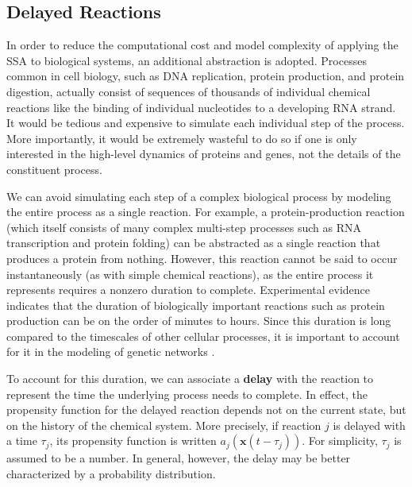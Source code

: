 \documentclass[english,letterpaper,12pt]{report}
\newcommand{\defkeywd}[1]{\textbf{#1}}
\renewcommand{\vec}[1]{\ensuremath{\mathbf{#1}}}
\newcommand{\delaytime}{\ensuremath{\tau}}
\begin{document}
\begin{doublespacing}

\subsection{Delayed Reactions} %
\label{sub:delayed-reactions}

In order to reduce the computational cost and model complexity of applying the SSA to biological systems, an additional abstraction is adopted. Processes common in cell biology, such as DNA replication, protein production, and protein digestion, actually consist of sequences of thousands of individual chemical reactions like the binding of individual nucleotides to a developing RNA strand. It would be tedious and expensive to simulate each individual step of the process. More importantly, it would be extremely wasteful to do so if one is only interested in the high-level dynamics of proteins and genes, not the details of the constituent process.

We can avoid simulating each step of a complex biological process by modeling the entire process as a single reaction. For example, a protein-production reaction (which itself consists of many complex multi-step processes such as RNA transcription and protein folding) can be abstracted as a single reaction that produces a protein from nothing. However, this reaction cannot be said to occur instantaneously (as with simple chemical reactions), as the entire process it represents requires a nonzero duration to complete. Experimental evidence indicates that the duration of biologically important reactions such as protein production can be on the order of minutes to hours. Since this duration is long compared to the timescales of other cellular processes, it is important to account for it in the modeling of genetic networks \cite{delay-oscillations}.

To account for this duration, we can associate a \defkeywd{delay} with the reaction to represent the time the underlying process needs to complete. In effect, the propensity function for the delayed reaction depends not on the current state, but on the history of the chemical system. More precisely, if reaction $j$ is delayed with a time $\delaytime_j$, its propensity function is written $a_j \left(\vec{x}(t - \delaytime_j) \right)$. For simplicity, $\delaytime_j$ is assumed to be a number. In general, however, the delay may be better characterized by a probability distribution.


\end{doublespacing}
\end{document}
